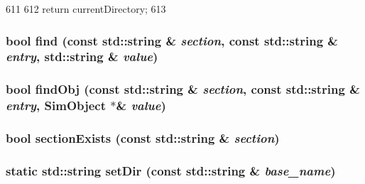 \begin{DoxyCode}
611 {
612     return currentDirectory;
613 }
\end{DoxyCode}
\hypertarget{classCheckpoint_a2f74eb45a42d3bbb66dac505415a2b23}{
\subsubsection[{find}]{\setlength{\rightskip}{0pt plus 5cm}bool find (const std::string \& {\em section}, \/  const std::string \& {\em entry}, \/  std::string \& {\em value})}}
\label{classCheckpoint_a2f74eb45a42d3bbb66dac505415a2b23}
\hypertarget{classCheckpoint_a9914b6054c5d5ef992db802c6649a958}{
\subsubsection[{findObj}]{\setlength{\rightskip}{0pt plus 5cm}bool findObj (const std::string \& {\em section}, \/  const std::string \& {\em entry}, \/  {\bf SimObject} $\ast$\& {\em value})}}
\label{classCheckpoint_a9914b6054c5d5ef992db802c6649a958}
\hypertarget{classCheckpoint_a29825a406e335b106b62bfec9d551283}{
\subsubsection[{sectionExists}]{\setlength{\rightskip}{0pt plus 5cm}bool sectionExists (const std::string \& {\em section})}}
\label{classCheckpoint_a29825a406e335b106b62bfec9d551283}
\hypertarget{classCheckpoint_a6172ec664484367153b35102f9c6b9ba}{
\subsubsection[{setDir}]{\setlength{\rightskip}{0pt plus 5cm}static std::string setDir (const std::string \& {\em base\_\-name})}}
\label{classCheckpoint_a6172ec664484367153b35102f9c6b9ba}


